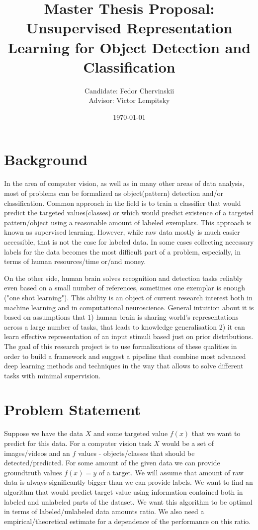 \documentclass[a4paper]{article}
\title{Master Thesis Proposal: Unsupervised Representation Learning for Object Detection and Classification}
\author{Candidate: Fedor Chervinskii\\ Advisor: Victor Lempitsky}
\date{\today}
\begin{document}
\maketitle

\section{Background}
In the area of computer vision, as well as in many other areas of data analysis, most of problems can be formalized as object(pattern) detection and/or classification. Common approach in the field is to train a classifier that would predict the targeted values(classes) or which would predict existence of a targeted pattern/object using a reasonable amount of labeled exemplars. This approach is known as supervised learning. However, while raw data mostly is much easier accessible, that is not the case for labeled data. In some cases collecting necessary labels for the data becomes the most difficult part of a problem, especially, in terms of human resources/time or/and money.

On the other side, human brain solves recognition and detection tasks reliably even based on a small number of references, sometimes one exemplar is enough ("one shot learning"). This ability is an object of  current research interest both in machine learning and in computational neuroscience. General intuition about it is based on assumptions that 1) human brain is sharing world's representations across a large number of tasks, that leads to knowledge generalisation 2) it can learn effective representation of an input stimuli based just on prior distributions. The goal of this research project is to use  formalizations of these qualities in order to build a framework and suggest a pipeline that combine most advanced deep learning methods and techniques in the way that allows to solve different tasks with minimal supervision.

\section{Problem Statement}

Suppose we have the data $X$ and some targeted value $f(x)$ that we want to predict for this data. For a computer vision task $X$ would be a set of images/videos and an $f$ values - objects/classes that should be detected/predicted. For some amount of the given data we can provide groundtruth values $f(x)=y$ of a target. We will assume that amount of raw data is always significantly bigger than we can provide labels. We want to find an algorithm that would predict target value using information contained both in labeled and unlabeled parts of the dataset. We want this algorithm to be optimal in terms of labeled/unlabeled data amounts ratio. We also need a empirical/theoretical estimate for a dependence of the performance on this ratio.
\end{document}
